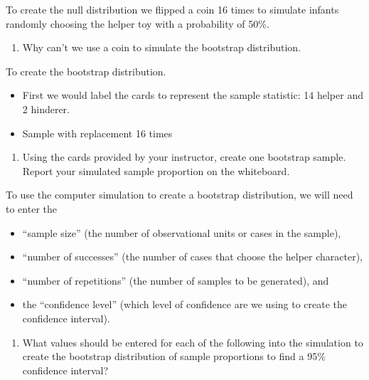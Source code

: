 \documentclass[
]{report}
\providecommand{\tightlist}{%
  \setlength{\itemsep}{0pt}\setlength{\parskip}{0pt}}
\begin{document}
To create the null distribution we flipped a coin 16 times to simulate infants randomly choosing the helper toy with a probability of 50\%.

\begin{enumerate}
\def\labelenumi{\arabic{enumi}.}
\setcounter{enumi}{4}
\tightlist
\item
  Why can't we use a coin to simulate the bootstrap distribution.
\end{enumerate}

\vspace{0.7in}

To create the bootstrap distribution.

\begin{itemize}
\item
  First we would label the cards to represent the sample statistic: 14 helper and 2 hinderer.
\item
  Sample with replacement 16 times
\end{itemize}

\begin{enumerate}
\def\labelenumi{\arabic{enumi}.}
\setcounter{enumi}{5}
\tightlist
\item
  Using the cards provided by your instructor, create one bootstrap sample. Report your simulated sample proportion on the whiteboard.
\end{enumerate}

\vspace{0.3in}

To use the computer simulation to create a bootstrap distribution, we will need to enter the

\begin{itemize}
\tightlist
\item
  ``sample size'' (the number of observational units or cases in the sample),
\item
  ``number of successes'' (the number of cases that choose the helper character),
\item
  ``number of repetitions'' (the number of samples to be generated), and
\item
  the ``confidence level'' (which level of confidence are we using to create the confidence interval).
\end{itemize}

\begin{enumerate}
\def\labelenumi{\arabic{enumi}.}
\setcounter{enumi}{6}
\tightlist
\item
  What values should be entered for each of the following into the simulation to create the bootstrap distribution of sample proportions to find a 95\% confidence interval?
  \vspace{1mm}
\end{enumerate}
\end{document}
